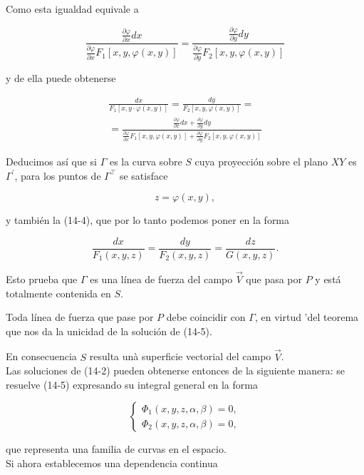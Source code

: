 \documentclass[10pt]{article}
\theoremstyle{plain}
\theoremstyle{definition}
\theoremstyle{remark}
\begin{document}
Como esta igualdad equivale a

$$
\frac{\frac{\partial \varphi}{\partial x} d x}{\frac{\partial \varphi}{\partial x} F_{1}[x, y, \varphi(x, y)]}=\frac{\frac{\partial \varphi}{\partial y} d y}{\frac{\partial \varphi}{\partial y} F_{2}[x, y, \varphi(x, y)]}
$$

y de ella puede obtenerse


\begin{gather*}
\frac{d x}{F_{1}[x, y \cdot \varphi(x, y)]}=\frac{d y}{F_{2}[x, y, \varphi(x, y)]}= \\
=\frac{\frac{\partial \varphi}{\partial x} d x+\frac{\partial \varphi}{\partial y} d y}{\frac{\partial \varphi}{\partial x} F_{1}[x, y, \varphi(x, y)]+\frac{\partial \varphi}{\partial y} F_{2}[x, y, \varphi(x, y)]} \tag{14-4}
\end{gather*}


Deducimos así que si $\Gamma$ es la curva sobre $S$ cuya proyección sobre el plano $X Y$ es $\Gamma^{\prime}$, para los puntos de $\Gamma^{\top}$ se satisface

$$
z=\varphi(x, y),
$$

y también la (14-4), que por lo tanto podemos poner en la forma


\begin{equation*}
\frac{d x}{F_{1}(x, y, z)}=\frac{d y}{F_{2}(x, y, z)}=\frac{d z}{G(x, y, z)} . \tag{14.5}
\end{equation*}


Esto prueba que $\Gamma$ es una línea de fuerza del campo $\vec{V}$ que pasa por $P$ y está totalmente contenida en $S$.

Toda línea de fuerza que pase por $P$ debe coincidir con $\Gamma$, en virtud 'del teorema que nos da la unicidad de la solución de (14-5).

En consecuencia $S$ resulta unà superficie vectorial del campo $\vec{V}$.\\
Las soluciones de (14-2) pueden obtenerse entonces de la siguiente manera: se resuelve (14-5) expresando su integral general en la forma

\[
\left\{\begin{array}{l}
\Phi_{1}(x, y, z, \alpha, \beta)=0,  \tag{14-6}\\
\Phi_{2}(x, y, z, \alpha, \beta)=0,
\end{array}\right.
\]

que representa una familia de curvas en el espacio.\\
Si ahora establecemos una dependencia continua
\end{document}
